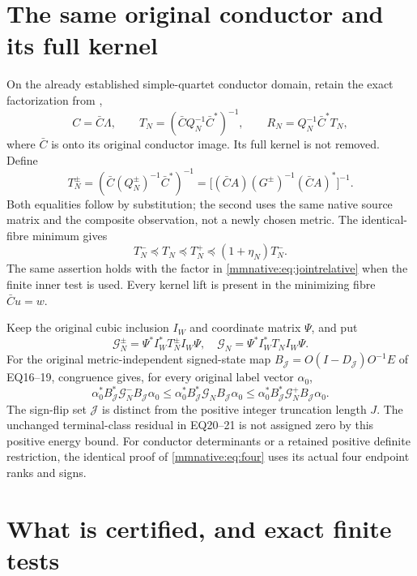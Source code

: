 \section{The same original conductor and its full kernel}

On the already established simple-quartet conductor domain, retain
the exact factorization from \cite{mmnative:EQ,mmnative:TR},
\[
 C=\bar C\Lambda,
 \qquad T_N=(\bar C Q_N^{-1}\bar C^*)^{-1},
 \qquad R_N=Q_N^{-1}\bar C^*T_N,
\]
where $\bar C$ is onto its original conductor image.  Its full
kernel is not removed.  Define
\begin{equation}\label{mmnative:eq:conductor}
 T_N^\pm=(\bar C(Q_N^\pm)^{-1}\bar C^*)^{-1}
 =\bigl[(\bar CA)(G^\pm)^{-1}(\bar CA)^*\bigr]^{-1}.
\end{equation}
Both equalities follow by substitution; the second uses the same
native source matrix and the composite observation, not a newly
chosen metric.  The identical-fibre minimum gives
\[
 T_N^-\preceq T_N\preceq T_N^+
 \preceq(1+\eta_N)T_N^-.
\]
The same assertion holds with the factor in \eqref{mmnative:eq:jointrelative}
when the finite inner test is used.  Every kernel lift is present in
the minimizing fibre $\bar Cu=w$.

Keep the original cubic inclusion $I_W$ and coordinate matrix $\Psi$,
and put
\[
 \mathcal G_N^\pm=\Psi^*I_W^*T_N^\pm I_W\Psi,
 \quad\mathcal G_N=\Psi^*I_W^*T_NI_W\Psi.
\]
For the original metric-independent signed-state map
$B_{\mathcal J}=O(I-D_{\mathcal J})O^{-1}E$ of EQ16--19, congruence
gives, for every original label vector $\alpha_0$,
\begin{equation}\label{mmnative:eq:defect}
 \alpha_0^*B_{\mathcal J}^*\mathcal G_N^-B_{\mathcal J}\alpha_0
 \le\alpha_0^*B_{\mathcal J}^*\mathcal G_NB_{\mathcal J}\alpha_0
 \le\alpha_0^*B_{\mathcal J}^*\mathcal G_N^+B_{\mathcal J}\alpha_0.
\end{equation}
The sign-flip set $\mathcal J$ is distinct from the positive integer
truncation length $J$.  The unchanged terminal-class residual in
EQ20--21 is not assigned zero by this positive energy bound.  For
conductor determinants or a retained positive definite restriction,
the identical proof of \eqref{mmnative:eq:four} uses its actual four endpoint
ranks and signs.

\section{What is certified, and exact finite tests}

